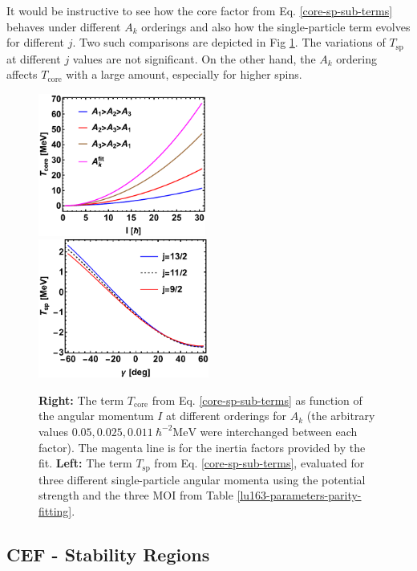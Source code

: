 It would be instructive to see how the core factor from Eq. \ref{core-sp-sub-terms} behaves under different $A_k$ orderings and also how the single-particle term evolves for different $j$. Two such comparisons are depicted in Fig \ref{fig-t-core-sp-terms}. The variations of $T_\text{sp}$ at different $j$ values are not significant. On the other hand, the $A_k$ ordering affects $T_\text{core}$ with a large amount, especially for higher spins.
\begin{figure}
    \centering
    \includegraphics[width=0.49\textwidth]{Chapters/Figures/parity-partners-plots/t-core.pdf}
    \includegraphics[width=0.5\textwidth]{Chapters/Figures/parity-partners-plots/t-sp.pdf}
    \caption{\textbf{Right:} The term $T_\text{core}$ from Eq. \ref{core-sp-sub-terms} as function of the angular momentum $I$ at different orderings for $A_k$ (the arbitrary values $0.05, 0.025, 0.011\ \hbar^{-2}\text{MeV}$ were interchanged between each factor). The magenta line is for the inertia factors provided by the fit. \textbf{Left:} The term $T_\text{sp}$ from Eq. \ref{core-sp-sub-terms}, evaluated for three different single-particle angular momenta using the potential strength and the three MOI from Table \ref{lu163-parameters-parity-fitting}.}
    \label{fig-t-core-sp-terms}
\end{figure}

\subsection{CEF - Stability Regions}

